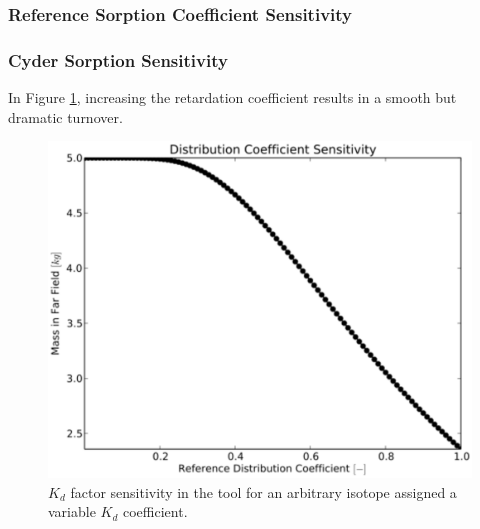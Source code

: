 
\subsubsection{Reference Sorption Coefficient Sensitivity}
\begin{frame}[ctb!]
\frametitle{Cyder Sorption Sensitivity}

In Figure \ref{fig:kd_result}, increasing the retardation 
coefficient results in a smooth but dramatic turnover. 

\begin{figure}[ht]
\centering
\includegraphics[width=0.7\linewidth]{./nuclide_demonstration/kd.eps}
\caption{$K_d$ factor sensitivity in the \Cyder tool for an arbitrary isotope 
assigned a variable $K_d$ coefficient.} 
\label{fig:kd_result}
\end{figure}
\end{frame}
